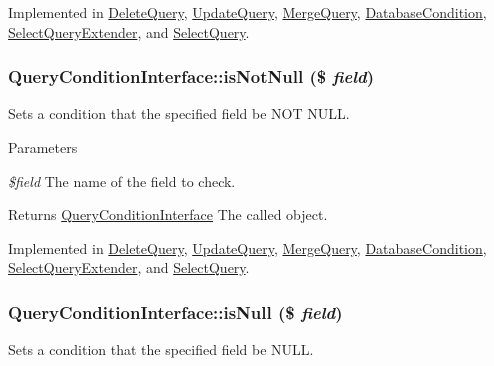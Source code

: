 Implemented in \hyperlink{classDeleteQuery_a22517a3fa29261685dd9f4a26b8cbb37}{DeleteQuery}, \hyperlink{classUpdateQuery_a04537fd021194c135a33c2e2f15d8493}{UpdateQuery}, \hyperlink{classMergeQuery_a0a92a08ad6933ecc4a796e9d50ea85f5}{MergeQuery}, \hyperlink{classDatabaseCondition_ab3f1025c61cd359b097f3c1e949d4b05}{DatabaseCondition}, \hyperlink{classSelectQueryExtender_aa250c6c085e53ac64607649f75b5f468}{SelectQueryExtender}, and \hyperlink{classSelectQuery_a0b3d1a7b33abeef2af08601330a80844}{SelectQuery}.\hypertarget{interfaceQueryConditionInterface_a8bbb6acc9c72911b165cf6eb1dc31453}{
\subsubsection[{isNotNull}]{\setlength{\rightskip}{0pt plus 5cm}QueryConditionInterface::isNotNull (\$ {\em field})}}
\label{interfaceQueryConditionInterface_a8bbb6acc9c72911b165cf6eb1dc31453}
Sets a condition that the specified field be NOT NULL.


\begin{DoxyParams}{Parameters}
\item[{\em \$field}]The name of the field to check.\end{DoxyParams}
\begin{DoxyReturn}{Returns}
\hyperlink{interfaceQueryConditionInterface}{QueryConditionInterface} The called object. 
\end{DoxyReturn}


Implemented in \hyperlink{classDeleteQuery_a673730f62b32a5111f4930d3a2e6cf89}{DeleteQuery}, \hyperlink{classUpdateQuery_a703cf7e16e0dd4e78c61e4c6ea948795}{UpdateQuery}, \hyperlink{classMergeQuery_a6eda0759442dcb9cfa940e5ced5cc7ba}{MergeQuery}, \hyperlink{classDatabaseCondition_aa7499e52cbf791273890fe3e1c47177b}{DatabaseCondition}, \hyperlink{classSelectQueryExtender_a24432e3ab40f7c1ce1404d6773e539f4}{SelectQueryExtender}, and \hyperlink{classSelectQuery_a52334c418025609d024d2a21c6e487ea}{SelectQuery}.\hypertarget{interfaceQueryConditionInterface_a2978b536a3fe62b21e940366c9cb5923}{
\subsubsection[{isNull}]{\setlength{\rightskip}{0pt plus 5cm}QueryConditionInterface::isNull (\$ {\em field})}}
\label{interfaceQueryConditionInterface_a2978b536a3fe62b21e940366c9cb5923}
Sets a condition that the specified field be NULL.


